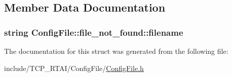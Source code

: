 \subsection{Member Data Documentation}
\hypertarget{structConfigFile_1_1file__not__found_a25e11d11b1a9b0f4ca663b21816c2a9a}{
\subsubsection[{filename}]{\setlength{\rightskip}{0pt plus 5cm}string {\bf ConfigFile::file\_\-not\_\-found::filename}}}
\label{structConfigFile_1_1file__not__found_a25e11d11b1a9b0f4ca663b21816c2a9a}


The documentation for this struct was generated from the following file:\begin{DoxyCompactItemize}
\item 
include/TCP\_\-RTAI/ConfigFile/\hyperlink{ConfigFile_8h}{ConfigFile.h}\end{DoxyCompactItemize}
